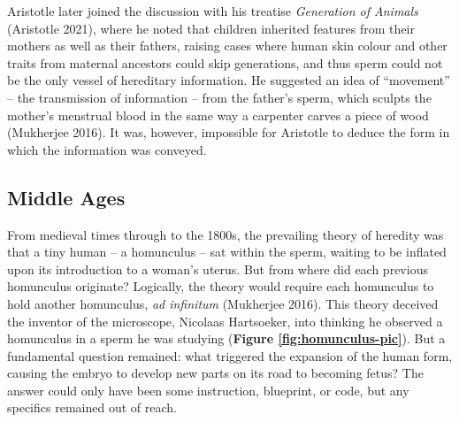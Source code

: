 \documentclass[
]{book}
\begin{document}
Aristotle later joined the discussion with his treatise \emph{Generation of Animals} (Aristotle 2021), where he noted that children inherited features from their mothers as well as their fathers, raising cases where human skin colour and other traits from maternal ancestors could skip generations, and thus sperm could not be the only vessel of hereditary information. He suggested an idea of ``movement'' -- the transmission of information -- from the father's sperm, which sculpts the mother's menstrual blood in the same way a carpenter carves a piece of wood (Mukherjee 2016). It was, however, impossible for Aristotle to deduce the form in which the information was conveyed.

\hypertarget{middle-ages}{%
\subsection{Middle Ages}\label{middle-ages}}

From medieval times through to the 1800s, the prevailing theory of heredity was that a tiny human -- a homunculus -- sat within the sperm, waiting to be inflated upon its introduction to a woman's uterus. But from where did each previous homunculus originate? Logically, the theory would require each homunculus to hold another homunculus, \emph{ad infinitum} (Mukherjee 2016). This theory deceived the inventor of the microscope, Nicolaas Hartsoeker, into thinking he observed a homunculus in a sperm he was studying (\textbf{Figure \ref{fig:homunculus-pic}}). But a fundamental question remained: what triggered the expansion of the human form, causing the embryo to develop new parts on its road to becoming fetus? The answer could only have been some instruction, blueprint, or code, but any specifics remained out of reach.
\end{document}
